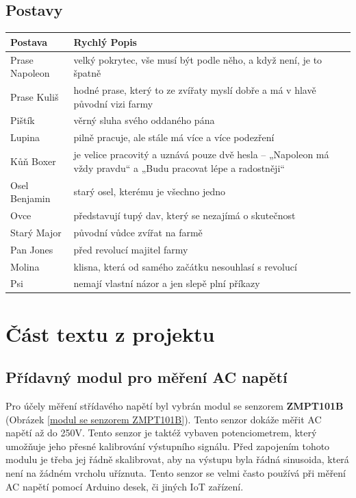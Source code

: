 \documentclass{article}
\newcommand{\sectionbreak}{\clearpage}
\begin{document}
\subsection{Postavy}
\begin{tabular}{|l|p{10cm}|}
  \hline
  {\bf Postava} & {\bf Rychlý Popis} \\
  \hline \hline
  Prase Napoleon         & velký pokrytec, vše musí být podle něho, a když není, je to špatně \\
  Prase Kuliš        & hodné prase, který to ze zvířaty myslí dobře a má v hlavě původní vizi farmy\\
  Pištík        & věrný sluha svého oddaného pána \\
  Lupina          & pilně pracuje, ale stále má více a více podezření\\
  Kůň Boxer         & je velice pracovitý a uznává pouze dvě hesla – „Napoleon má vždy pravdu“ a „Budu pracovat lépe a radostněji“\\
  Osel Benjamin         & starý osel, kterému je všechno jedno\\
  Ovce              & představují tupý dav, který se nezajímá o skutečnost\\
  Starý Major & původní vůdce zvířat na farmě\\
  Pan Jones & před revolucí majitel farmy\\
  Molina & klisna, která od samého začátku nesouhlasí s revolucí\\
  Psi & nemají vlastní názor a jen slepě plní příkazy \\
  
  \hline
\end{tabular}

\sectionbreak

\section{Část textu z projektu}
\subsection{Přídavný modul pro měření AC napětí}

Pro účely měření střídavého napětí byl vybrán modul se senzorem 
\textbf{ZMPT101B} (Obrázek \ref{modul se senzorem ZMPT101B}). Tento senzor dokáže měřit AC napětí až do 250V. 
Tento senzor je taktéž vybaven potenciometrem, který umožňuje jeho přesné kalibrování výstupního signálu. Před 
zapojením tohoto modulu je třeba jej řádně skalibrovat, aby na výstupu byla řádná sinusoida, která není na 
žádném vrcholu uříznuta. Tento senzor se velmi často používá při měření AC napětí pomocí Arduino desek, či 
jiných IoT zařízení.
\end{document}
